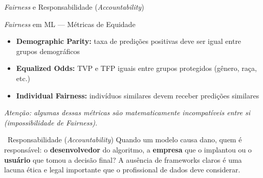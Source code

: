 \documentclass[aspectratio=169]{beamer}
\begin{document}
\begin{frame}{\textit{Fairness} e Responsabilidade (\textit{Accountability})}
    \begin{block}{\textit{Fairness} em ML --- Métricas de Equidade}
        \begin{itemize}
            \item \textbf{Demographic Parity:} taxa de predições positivas deve ser igual entre grupos demográficos
            \item \textbf{Equalized Odds:} TVP e TFP iguais entre grupos protegidos (gênero, raça, etc.)
            \item \textbf{Individual Fairness:} indivíduos similares devem receber predições similares
        \end{itemize}
        \vspace{0.1cm}
        \textit{\small Atenção: algumas dessas métricas são matematicamente incompatíveis entre si (impossibilidade de Fairness).}
    \end{block}
    \vspace{0.2cm}
    \begin{alertblock}{\faQuestion\ Responsabilidade (\textit{Accountability})}
        Quando um modelo causa dano, quem é responsável: o \textbf{desenvolvedor} do algoritmo, a \textbf{empresa} que o implantou ou o \textbf{usuário} que tomou a decisão final?
        A ausência de frameworks claros é uma lacuna ética e legal importante que o profissional de dados deve considerar.
    \end{alertblock}
\end{frame}

\end{document}
